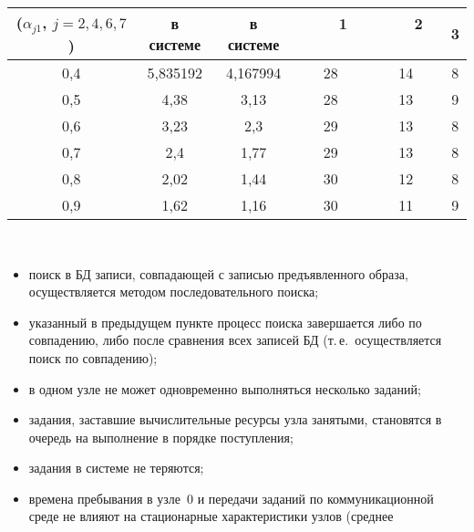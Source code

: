 \begin{multicols}{2}
\begin{table*}
\begin{center}
\begin{tabular}{|c|c|c|c|c|c|}
\cline{4-6}
($\alpha_{j1}$, $j=2,4,6,7$)& в системе& в системе&\ \ \ \,1\,\ \ \ &\ \ \ \,2\,\ \ \ &3\\
\hline
0,4&\hphantom{9999}5,835192&\hphantom{9999}4,167994&28&14&8\\
0,5&4,38&3,13&28&13&9\\
0,6&3,23&2,3\hphantom{9}&29&13&8\\
0,7&2,4\hphantom{9}&1,77&29&13&8\\
0,8&2,02&1,44&30&12&8\\
0,9&1,62&1,16&30&11&9\\
\hline
\end{tabular}
\vspace*{-6pt}
\end{center}
\end{table*}
\begin{figure*}[b] %
\vspace*{-6pt}
\begin{center}
\mbox{%
\epsfxsize=144mm
}
\end{center}
\vspace*{-9pt}
\end{figure*}
\begin{itemize}
\item поиск в БД записи, совпадающей с записью предъявленного образа,
осуществляется методом последовательного поиска;
\item указанный в предыдущем пункте процесс поиска завершается либо по
совпадению, либо после сравнения всех записей БД (т.\,е.\ осуществляется
поиск по совпадению);
\item в одном узле не может одновременно выполняться несколько заданий;
\item задания, заставшие вычислительные ресурсы узла занятыми,
становятся в очередь на выполнение в порядке поступления;
\item задания в системе не теряются;
\item времена пребывания в узле~0 и передачи заданий по
коммуникационной среде не влияют на
 стационарные характеристики узлов
(среднее\linebreak\vspace*{-12pt}


\end{itemize}
\end{multicols}
